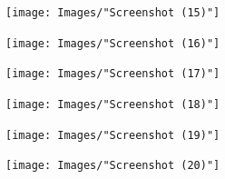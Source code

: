 \documentclass[11pt]{article}
\begin{document}
			\begin{figure}[b]
				\texttt{[image: Images/"Screenshot (15)"]}
				\label{fig:r_code1}
			\end{figure}
			
			\begin{figure}[!]
				\texttt{[image: Images/"Screenshot (16)"]}
				\label{fig:r_code1}
			\end{figure}
			

			\begin{figure}[!]
				\texttt{[image: Images/"Screenshot (17)"]}
				\label{fig:r_code1}
			\end{figure}
			
			\begin{figure}[!]
				\texttt{[image: Images/"Screenshot (18)"]}
				\label{fig:r_code1}
			\end{figure}
			
			\begin{figure}[!]
				\texttt{[image: Images/"Screenshot (19)"]}
				\label{fig:r_code1}
			\end{figure}
			
			\begin{figure}[!]
				\texttt{[image: Images/"Screenshot (20)"]}
				\label{fig:r_code1}
			\end{figure}
		
		
		
\end{document}
